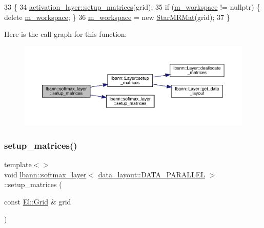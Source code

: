 \begin{DoxyCode}
33                                                     \{
34   \hyperlink{classlbann_1_1Layer_a57bbe21131dc00ab5cf9ea5e3656808e}{activation\_layer::setup\_matrices}(grid);
35   \textcolor{keywordflow}{if} (\hyperlink{classlbann_1_1softmax__layer_a604e614de25758f0072308c7efdd5bdb}{m\_workspace} != \textcolor{keyword}{nullptr}) \{ \textcolor{keyword}{delete} \hyperlink{classlbann_1_1softmax__layer_a604e614de25758f0072308c7efdd5bdb}{m\_workspace}; \}
36   \hyperlink{classlbann_1_1softmax__layer_a604e614de25758f0072308c7efdd5bdb}{m\_workspace} = \textcolor{keyword}{new} \hyperlink{base_8hpp_a638c3ca7c22f916d23415b234420b9f1}{StarMRMat}(grid);
37 \}
\end{DoxyCode}
Here is the call graph for this function\+:\nopagebreak
\begin{figure}[H]
\begin{center}
\leavevmode
\includegraphics[width=350pt]{classlbann_1_1softmax__layer_ad011596d678ba62d3a92b0e9b2acae54_cgraph}
\end{center}
\end{figure}
\mbox{\label{classlbann_1_1softmax__layer_ae9472c4f1d22ff51cb7508d17e37c61d}} 
\subsubsection{\texorpdfstring{setup\+\_\+matrices()}{setup\_matrices()}\hspace{0.1cm}{\footnotesize\ttfamily [2/3]}}
{\footnotesize\ttfamily template$<$$>$ \\
void \hyperlink{classlbann_1_1softmax__layer}{lbann\+::softmax\+\_\+layer}$<$ \hyperlink{base_8hpp_a786677cbfb3f5677b4d84f3056eb08dba37d2a3465f7cbf4ab60f4e79944d0638}{data\+\_\+layout\+::\+D\+A\+T\+A\+\_\+\+P\+A\+R\+A\+L\+L\+EL} $>$\+::setup\+\_\+matrices (\begin{DoxyParamCaption}\item[{const \hyperlink{base_8hpp_a9951bb1719d534e0401b1f06cad19eab}{El\+::\+Grid} \&}]{grid }\end{DoxyParamCaption})\hspace{0.3cm}{\ttfamily [virtual]}}

